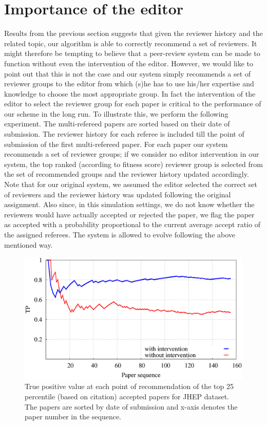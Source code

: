 \noindent
\section{Importance of the editor}
\label{editor_imp}

Results from the previous section suggests that given the reviewer history and the related topic, our algorithm is able to correctly recommend a set of reviewers. It might therefore be tempting to believe that a peer-review system can be made to function without even the intervention of the editor. However, we would like to point out that this is not the case and our system simply recommends a set of reviewer groups to the editor from which (s)he has to use his/her expertise and knowledge to choose the most appropriate group. In fact the intervention of the editor to select the reviewer group for each paper is critical to the performance of our scheme in the long run. To illustrate this, we perform the following experiment. The multi-refereed papers are sorted based on their date of submission. The reviewer history for each referee is included till the point of submission of the first multi-refereed paper. For each paper our system recommends a set of reviewer groups; if we consider no editor intervention in our system, the top ranked (according to fitness score) reviewer group is selected from the set of recommended groups and the 
reviewer history updated accordingly. Note that for our original system, we assumed the editor selected the correct set of reviewers and the reviewer history was updated following the original assignment. Also since, in this simulation settings, we do not know whether the reviewers would have actually accepted or rejected the paper, we flag the paper as accepted with a probability proportional to the current average accept ratio of the assigned referees. The system is allowed to evolve following the above mentioned way.   

\begin{figure}
\centering
\includegraphics[scale = 0.26]{./texfiles/Chapter_4/cikm_17/figures/G_A_comp.eps}
\caption{\label{fig:ed_imp}True positive value at each point of recommendation of the top 25 percentile (based on citation) accepted papers for JHEP dataset. 
The papers are sorted by date of submission and x-axis denotes the paper number in the sequence.}
\vspace{4mm}
\end{figure}
\medskip

